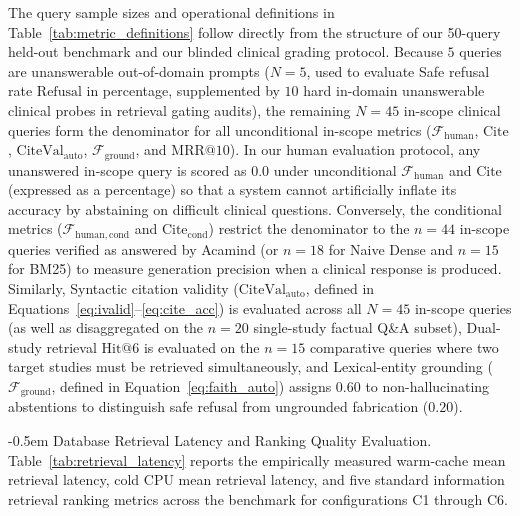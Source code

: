 \documentclass[10pt]{SPIIRAS_Proceedings}
\makeatletter
\renewcommand\subsection{\@startsection{subsection}{2}{\parindent}%
  {\z@}%
  {-0.5em}%
  {\normalfont\normalsize\bfseries}}
\makeatother
\begin{document}
The query sample sizes and operational definitions in Table~\ref{tab:metric_definitions} follow directly from the structure of our 50-query held-out benchmark and our blinded clinical grading protocol. Because $5$ queries are unanswerable out-of-domain prompts ($N = 5$, used to evaluate Safe refusal rate $\mathrm{Refusal}$ in percentage, supplemented by $10$ hard in-domain unanswerable clinical probes in retrieval gating audits), the remaining $N = 45$ in-scope clinical queries form the denominator for all unconditional in-scope metrics ($\mathcal{F}_{\mathrm{human}}$, $\mathrm{Cite}$, $\mathrm{CiteVal}_{\mathrm{auto}}$, $\mathcal{F}_{\mathrm{ground}}$, and $\mathrm{MRR@10}$). In our human evaluation protocol, any unanswered in-scope query is scored as $0.0$ under unconditional $\mathcal{F}_{\mathrm{human}}$ and $\mathrm{Cite}$ (expressed as a percentage) so that a system cannot artificially inflate its accuracy by abstaining on difficult clinical questions. Conversely, the conditional metrics ($\mathcal{F}_{\mathrm{human, cond}}$ and $\mathrm{Cite}_{\mathrm{cond}}$) restrict the denominator to the $n = 44$ in-scope queries verified as answered by Acamind (or $n = 18$ for Naive Dense and $n = 15$ for BM25) to measure generation precision when a clinical response is produced. Similarly, Syntactic citation validity ($\mathrm{CiteVal}_{\mathrm{auto}}$, defined in Equations~\ref{eq:ivalid}--\ref{eq:cite_acc}) is evaluated across all $N = 45$ in-scope queries (as well as disaggregated on the $n = 20$ single-study factual Q\&A subset), Dual-study retrieval $\mathrm{Hit@6}$ is evaluated on the $n = 15$ comparative queries where two target studies must be retrieved simultaneously, and Lexical-entity grounding ($\mathcal{F}_{\mathrm{ground}}$, defined in Equation~\ref{eq:faith_auto}) assigns $0.60$ to non-hallucinating abstentions to distinguish safe refusal from ungrounded fabrication ($0.20$).

\subsection{Database Retrieval Latency and Ranking Quality Evaluation.} \label{sec:retrieval_latency} Table~\ref{tab:retrieval_latency} reports the empirically measured warm-cache mean retrieval latency, cold CPU mean retrieval latency, and five standard information retrieval ranking metrics across the benchmark for configurations C1 through C6.
\end{document}
